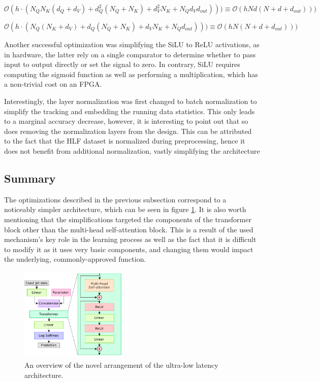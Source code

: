 \begin{equation}\label{eq:qkv-complexity-time-simple}
  \mathcal{O}(h \cdot (N_Q N_K (d_Q + d_V) + d_Q^2 (N_Q + N_K) + d_V^2 N_K + N_Q d_V d_{out}) )) \equiv
  \mathcal{O}(h N d (N + d + d_{out}) ))
\end{equation}

\begin{equation}\label{eq:qkv-complexity-space-simple}
  \mathcal{O}(h \cdot (N_Q (N_K + d_V) + d_Q (N_Q + N_K) + d_V N_K + N_Q d_{out}) )) \equiv
  \mathcal{O}(h N (N + d + d_{out}) ))
\end{equation}

Another successful optimization was simplifying the SiLU to ReLU activations, as in hardware, the latter rely on a single comparator to determine whether to pass input to output directly or set the signal to zero. In contrary, SiLU requires computing the sigmoid function as well as performing a multiplication, which has a non-trivial cost on an FPGA.

Interestingly, the layer normalization was first changed to batch normalization to simplify the tracking and embedding the running data statistics. This only leads to a marginal accuracy decrease, however, it is interesting to point out that so does removing the normalization layers from the design. This can be attributed to the fact that the HLF dataset is normalized during preprocessing, hence it does not benefit from additional normalization, vastly simplifying the architecture

\subsection{Summary}
The optimizations described in the previous subsection correspond to a noticeably simpler architecture, which can be seen in figure \ref{fig:constituent-net-simplified}. It is also worth mentioning that the simplifications targeted the components of the transformer block other than the multi-head self-attention block. This is a result of the used mechanism's key role in the learning process as well as the fact that it is difficult to modify it as it uses very basic components, and changing them would impact the underlying, commonly-approved function.

\begin{figure}[hpt!]
  \centering
  \includegraphics[trim={0cm 0cm 0cm 0cm}, width=0.45\textwidth, center]{models/constituent_net_simplified.pdf}
  \caption{An overview of the novel arrangement of the ultra-low latency architecture.}
  \label{fig:constituent-net-simplified}
\end{figure}


